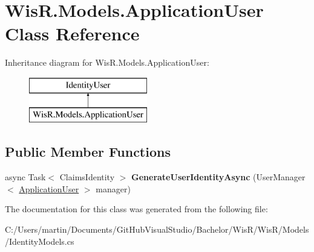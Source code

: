 \hypertarget{class_wis_r_1_1_models_1_1_application_user}{}\section{Wis\+R.\+Models.\+Application\+User Class Reference}
\label{class_wis_r_1_1_models_1_1_application_user}
Inheritance diagram for Wis\+R.\+Models.\+Application\+User\+:\begin{figure}[H]
\begin{center}
\leavevmode
\includegraphics[height=2.000000cm]{class_wis_r_1_1_models_1_1_application_user}
\end{center}
\end{figure}
\subsection*{Public Member Functions}
\begin{DoxyCompactItemize}
\item 
\hypertarget{class_wis_r_1_1_models_1_1_application_user_a5f6cfca881bd468aa603d56b17e58ab4}{}async Task$<$ Claims\+Identity $>$ {\bfseries Generate\+User\+Identity\+Async} (User\+Manager$<$ \hyperlink{class_wis_r_1_1_models_1_1_application_user}{Application\+User} $>$ manager)\label{class_wis_r_1_1_models_1_1_application_user_a5f6cfca881bd468aa603d56b17e58ab4}

\end{DoxyCompactItemize}


The documentation for this class was generated from the following file\+:\begin{DoxyCompactItemize}
\item 
C\+:/\+Users/martin/\+Documents/\+Git\+Hub\+Visual\+Studio/\+Bachelor/\+Wis\+R/\+Wis\+R/\+Models/Identity\+Models.\+cs\end{DoxyCompactItemize}
